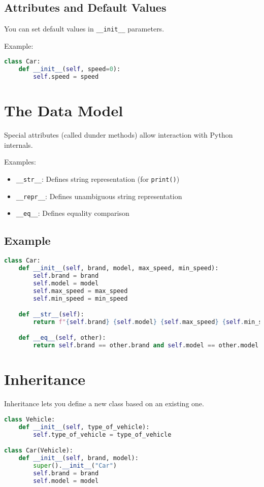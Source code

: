 \documentclass[12pt,a4paper]{article}
\begin{document}
\subsection{Attributes and Default Values}
You can set default values in \texttt{\_\_init\_\_} parameters.\newline

Example:
\begin{lstlisting}[language=Python]
class Car:
    def __init__(self, speed=0):
        self.speed = speed
\end{lstlisting}

\section{The Data Model}
Special attributes (called dunder methods) allow interaction with Python internals.

Examples:
\begin{itemize}
  \item \texttt{\_\_str\_\_}: Defines string representation (for \texttt{print()})
  \item \texttt{\_\_repr\_\_}: Defines unambiguous string representation
  \item \texttt{\_\_eq\_\_}: Defines equality comparison
\end{itemize}

\subsection{Example}
\begin{lstlisting}[language=Python]
class Car:
    def __init__(self, brand, model, max_speed, min_speed):
        self.brand = brand
        self.model = model
        self.max_speed = max_speed
        self.min_speed = min_speed

    def __str__(self):
        return f"{self.brand} {self.model} {self.max_speed} {self.min_speed}"

    def __eq__(self, other):
        return self.brand == other.brand and self.model == other.model
\end{lstlisting}

\section{Inheritance}
Inheritance lets you define a new class based on an existing one.

\begin{lstlisting}[language=Python]
class Vehicle:
    def __init__(self, type_of_vehicle):
        self.type_of_vehicle = type_of_vehicle

class Car(Vehicle):
    def __init__(self, brand, model):
        super().__init__("Car")
        self.brand = brand
        self.model = model
\end{lstlisting}
\end{document}
